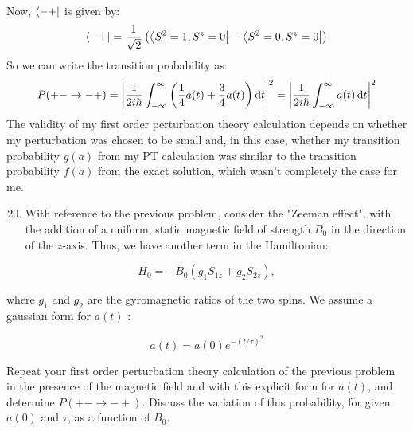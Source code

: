 \documentclass[12pt]{article}
\begin{document}
Now, $\bra{-+}$ is given by:
\begin{equation}
  \bra{-+} = \frac{1}{\sqrt{2}}\left(\bra{S^2 = 1, S^z = 0} - \bra{S^2 = 0, S^z = 0}\right)
\end{equation}
So we can write the transition probability as:
\begin{equation}
  P(+-\rightarrow-+) = \abs{\frac{1}{2i\hbar}\int_{-\infty}^{\infty} \left(\frac{1}{4}a(t) + \frac{3}{4}a(t)\right)\dd{t}}^2 = \abs{\frac{1}{2i\hbar}\int_{-\infty}^{\infty} a(t)\dd{t}}^2
\end{equation}
The validity of my first order perturbation theory calculation depends on whether my perturbation was chosen to be small and, in this case, whether my transition probability $g(a)$ from my PT calculation was similar to the transition probability $f(a)$ from the exact solution, which wasn't completely the case for me.\\

\begin{enumerate}
  \setcounter{enumi}{19}
  \item With reference to the previous problem, consider the "Zeeman effect", with the addition of a uniform, static magnetic field of strength $B_{0}$ in the direction of the $z$-axis. Thus, we have another term in the Hamiltonian:
\end{enumerate}

$$
H_{0}=-B_{0}\left(g_{1} S_{1 z}+g_{2} S_{2 z}\right),
$$

where $g_{1}$ and $g_{2}$ are the gyromagnetic ratios of the two spins. We assume a gaussian form for $a(t)$ :

$$
a(t)=a(0) e^{-(t / \tau)^{2}}
$$

Repeat your first order perturbation theory calculation of the previous problem in the presence of the magnetic field and with this explicit form for $a(t)$, and determine $P(+-\rightarrow-+)$. Discuss the variation of this probability, for given $a(0)$ and $\tau$, as a function of $B_{0}$.
\end{document}
